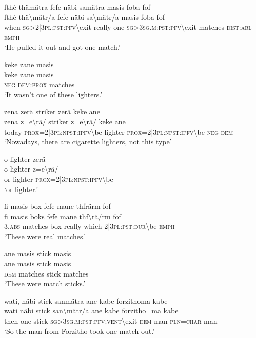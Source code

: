 \ea\label{ex:11:a2516}
fthé thämätra fefe näbi samätra masis foba fof\\
\gll fthé	thä{\textbackslash}mätr/a	fefe	näbi	sa{\textbackslash}mätr/a	masis	foba	fof\\
     when	\textsc{sg}>2|3\textsc{pl}:\textsc{pst}:\textsc{pfv}{\textbackslash}exit	really	one	\textsc{sg}>3\textsc{sg}.\textsc{m}:\textsc{pst}:\textsc{pfv}{\textbackslash}exit	matches	\textsc{dist}:\textsc{abl}	\textsc{emph}\\
\glt `He pulled it out and got one match.'
\z

\ea\label{ex:11:a2517}
keke zane masis\\
\gll keke	zane	masis\\
     \textsc{neg}	\textsc{dem}:\textsc{prox}	matches\\
\glt `It wasn't one of these lighters.'
\z

\ea\label{ex:11:a2518}
zena zerä striker zerä keke ane\\
\gll zena	z=e{\textbackslash}rä/	striker	z=e{\textbackslash}rä/	keke	ane\\
     today	\textsc{prox}=2|3\textsc{pl}:\textsc{npst}:\textsc{ipfv}{\textbackslash}be	lighter	\textsc{prox}=2|3\textsc{pl}:\textsc{npst}:\textsc{ipfv}{\textbackslash}be	\textsc{neg}	\textsc{dem}\\
\glt `Nowadays, there are cigarette lighters, not this type'
\z

\ea\label{ex:11:a2519}
o lighter zerä\\
\gll o	lighter	z=e{\textbackslash}rä/\\
     or	lighter	\textsc{prox}=2|3\textsc{pl}:\textsc{npst}:\textsc{ipfv}{\textbackslash}be\\
\glt `or lighter.'
\z

\ea\label{ex:11:a2520}
fi masis box fefe mane thfrärm fof\\
\gll fi	masis	boks	fefe	mane	thf{\textbackslash}rä/rm	fof\\
     3.\textsc{abs}	matches	box	really	which	2|3\textsc{pl}:\textsc{pst}:\textsc{dur}{\textbackslash}be	\textsc{emph}\\
\glt `These were real matches.'
\z

\ea\label{ex:11:a2521}
ane masis stick masis\\
\gll ane	masis	stick	masis\\
     \textsc{dem}	matches	stick	matches\\
\glt `These were match sticks.'
\z

\ea\label{ex:11:a2523}
wati, näbi stick sanmätra ane kabe forzithoma kabe\\
\gll wati	näbi	stick	san{\textbackslash}mätr/a	ane	kabe	forzitho=ma	kabe\\
     then	one	stick	\textsc{sg}>3\textsc{sg}.\textsc{m}:\textsc{pst}:\textsc{pfv}:\textsc{vent}{\textbackslash}exit	\textsc{dem}	man	\textsc{pln}=\textsc{char}	man\\
\glt `So the man from Forzitho took one match out.'
\z

